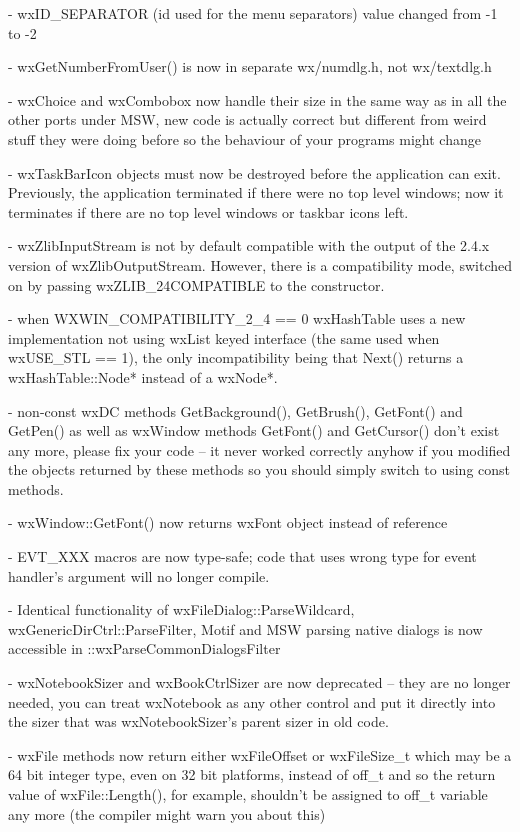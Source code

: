 - wxID\_SEPARATOR (id used for the menu separators) value changed from -1 to -2

- wxGetNumberFromUser() is now in separate wx/numdlg.h, not wx/textdlg.h

- wxChoice and wxCombobox now handle their size in the same way as in all the
  other ports under MSW, new code is actually correct but different from weird
  stuff they were doing before so the behaviour of your programs might change

- wxTaskBarIcon objects must now be destroyed before the application can exit.
  Previously, the application terminated if there were no top level windows;
  now it terminates if there are no top level windows or taskbar icons left.

- wxZlibInputStream is not by default compatible with the output of the
  2.4.x version of wxZlibOutputStream. However, there is a compatibility mode,
  switched on by passing wxZLIB\_24COMPATIBLE to the constructor.

- when WXWIN\_COMPATIBILITY\_2\_4 == 0 wxHashTable uses a new implementation
  not using wxList keyed interface (the same used when wxUSE\_STL == 1),
  the only incompatibility being that Next() returns a wxHashTable::Node*
  instead of a wxNode*.

- non-const wxDC methods GetBackground(), GetBrush(), GetFont() and GetPen()
  as well as wxWindow methods GetFont() and GetCursor() don't exist any more,
  please fix your code -- it never worked correctly anyhow if you modified the
  objects returned by these methods so you should simply switch to using const
  methods.

- wxWindow::GetFont() now returns wxFont object instead of reference

- EVT\_XXX macros are now type-safe; code that uses wrong type for event
  handler's argument will no longer compile.

- Identical functionality of wxFileDialog::ParseWildcard,
  wxGenericDirCtrl::ParseFilter, Motif and MSW parsing native dialogs
  is now accessible in ::wxParseCommonDialogsFilter

- wxNotebookSizer and wxBookCtrlSizer are now deprecated -- they are no longer
  needed, you can treat wxNotebook as any other control and put it directly
  into the sizer that was wxNotebookSizer's parent sizer in old code.

- wxFile methods now return either wxFileOffset or wxFileSize\_t which may be a
  64 bit integer type, even on 32 bit platforms, instead of off\_t and so the
  return value of wxFile::Length(), for example, shouldn't be assigned to off\_t
  variable any more (the compiler might warn you about this)

